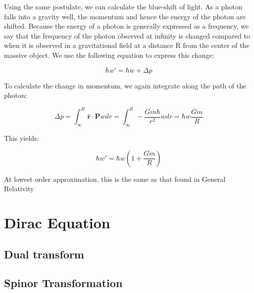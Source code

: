 \documentclass {article}
\renewcommand\vec{\mathbf}
\let\OldHat\hat
\renewcommand{\hat}[1]{\OldHat{\mathbf{#1}}}
\begin{document}
Using the same postulate, we can calculate the blue-shift of light. As a photon falls into a gravity well, the momentum and hence the energy of the photon are shifted. Because the energy of a photon is generally expressed as a frequency, we say that the frequency of the photon observed at infinity is changed compared to when it is observed in a gravitational field at a distance R from the center of the massive object. We use the following equation to express this change:

$$\hbar w' = \hbar w + \Delta p $$

To calculate the change in momentum, we again integrate along the path of the photon:

$$\Delta p = \int_{\infty}^R \hat r \cdot \vec P w dr= \int_{\infty}^R - \frac {Gm\hbar}{r^2} w dr = \hbar w \frac {Gm}R $$

This yields:

$$\hbar w' = \hbar w \left( 1 + \frac {Gm}R \right) $$

At lowest order approximation, this is the same as that found in General Relativity

\newpage

\section{Dirac Equation}
\subsection{Dual transform}
\newpage
\subsection{Spinor Transformation}
\newpage
\end{document}
